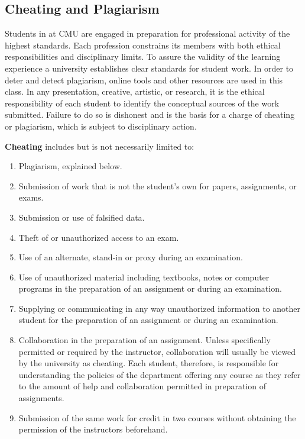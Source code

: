 \subsection{Cheating and Plagiarism}
Students in at CMU are engaged in preparation for professional activity of the highest standards. 
Each profession constrains its members with both ethical responsibilities and disciplinary limits. 
To assure the validity of the learning experience a university establishes clear standards for student work. 
In order to deter and detect plagiarism, online tools and other resources are used in this class.
In any presentation, creative, artistic, or research, 
it is the ethical responsibility of each student to identify the conceptual sources of the work submitted. 
Failure to do so is dishonest and is the basis for a charge of cheating or plagiarism, 
which is subject to disciplinary action.

\textbf{Cheating} includes but is not necessarily limited to:
\begin{enumerate}
\item Plagiarism, explained below.
\item Submission of work that is not the student's own for papers, assignments, or exams.
\item Submission or use of falsified data.
\item Theft of or unauthorized access to an exam.
\item Use of an alternate, stand-in or proxy during an examination.
\item Use of unauthorized material including textbooks, notes or computer programs in the preparation of an assignment or during an examination.
\item Supplying or communicating in any way unauthorized information to another student for the preparation of an assignment or during an examination.
\item Collaboration in the preparation of an assignment. Unless specifically permitted or required by the instructor, collaboration will usually be viewed by the university as cheating. Each student, therefore, is responsible for understanding the policies of the department offering any course as they refer to the amount of help and collaboration permitted in preparation of assignments.
\item Submission of the same work for credit in two courses without obtaining the permission of the instructors beforehand.
\end{enumerate}

